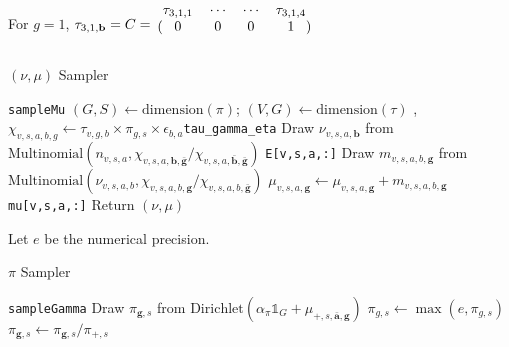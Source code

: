 \documentclass{article}
\newcommand{\code}[1]{\colorbox{light-gray}{\texttt{#1}}}
\newcommand\indexsum[1]{\mathbf{\bar{#1}}}
\newcommand\indexvec[1]{\mathbf{#1}}
\newcommand\countdetail{m}
\begin{document}
For $g=1$,
$\tau_{3,1,\indexvec{b}}=C=\begin{blockarray}{cccc}
\tau_{3,1,1}&\cdots&\cdots&\tau_{3,1,4}\\
    \begin{block}{(cccc)}
    0&0&0&1\\
    \end{block}
    \end{blockarray}$



\begin{algorithm}[H]
\caption{$(\nu,\mu)$ Sampler }\label{alg:desman_tau}
\begin{algorithmic}
\Procedure{$\mathrm{sample}_{\nu,\mu,\countdetail}$}{$n,\Theta=(\tau,\pi,\epsilon)$}\hfill\code{sampleMu}
\State $(G,S)\gets\mathrm{dimension}(\pi)$; $(V,G)\gets\mathrm{dimension}(\tau) $
,
\State $\chi_{v,s,a,b,g}\gets\tau_{v,g,b}\times\pi_{g,s}\times \epsilon_{b,a}${\hfill \code{tau\_gamma\_eta}}
\EndFor
{} 
            \State Draw $\nu_{v,s,a,\indexvec{b}}$ from $\mathrm{Multinomial}(n_{v,s,a},\chi_{v,s,a,\indexvec{b},\indexsum{g}}/\chi_{v,s,a,\indexsum{b},\indexsum{g}})$
             \hfill\code{E[v,s,a,:]}
            \State{$\mu_{v,s,a,\indexvec{g}}\gets\mathbb{0}_G$}
                \State Draw $\countdetail_{v,s,a,b,\indexvec{g}}$ from $\mathrm{Multinomial}(\nu_{v,s,a,b},\chi_{v,s,a,b,\indexvec{g}}/\chi_{v,s,a,b,\indexsum{g}})$ 
                \State $\mu_{v,s,a,\indexvec{g}}\gets \mu_{v,s,a,\indexvec{g}}+\countdetail_{v,s,a,b,\indexvec{g}}$\hfill\code{mu[v,s,a,:]}
            \EndFor    
        \EndFor
    \EndFor
\EndFor
\State Return $(\nu,\mu)$
\EndProcedure
\end{algorithmic}
\end{algorithm}



Let $e$ be the numerical precision.

\begin{algorithm}[H]
\caption{$\pi$ Sampler }\label{alg:desman_tau}
\begin{algorithmic}
\hfill\code{sampleGamma}
        \State Draw $\pi_{\indexvec{g},s}$ from
        $\mathrm{Dirichlet}(\alpha_\pi\mathds{1}_G+\mu_{+,s,\indexsum{a},\indexvec{g}})$
    \EndFor
\State $\pi_{g,s}\gets\max(e,\pi_{g,s})$
    \EndFor
\State $\pi_{\indexvec{g},s}\gets\pi_{\indexvec{g},s}/\pi_{+,s}$
    \EndFor
\EndProcedure
\end{algorithmic}
\end{algorithm}
\end{document}
